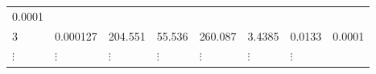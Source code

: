 \documentclass[]{book}
\begin{document}
\begin{enumerate}
\begin{longtable}[]{@{}llllllll@{}}
\begin{minipage}[t]{0.11\columnwidth}
  0.0001\strut
  \end{minipage}\tabularnewline
  \begin{minipage}[t]{0.02\columnwidth}\raggedright
  3\strut
  \end{minipage} & \begin{minipage}[t]{0.12\columnwidth}\raggedright
  0.000127\strut
  \end{minipage} & \begin{minipage}[t]{0.07\columnwidth}\raggedright
  204.551\strut
  \end{minipage} & \begin{minipage}[t]{0.07\columnwidth}\raggedright
  55.536\strut
  \end{minipage} & \begin{minipage}[t]{0.10\columnwidth}\raggedright
  260.087\strut
  \end{minipage} & \begin{minipage}[t]{0.20\columnwidth}\raggedright
  3.4385\strut
  \end{minipage} & \begin{minipage}[t]{0.10\columnwidth}\raggedright
  0.0133\strut
  \end{minipage} & \begin{minipage}[t]{0.11\columnwidth}\raggedright
  0.0001\strut
  \end{minipage}\tabularnewline
  \begin{minipage}[t]{0.02\columnwidth}\raggedright
  \(\vdots\)\strut
  \end{minipage} & \begin{minipage}[t]{0.12\columnwidth}\raggedright
  \(\vdots\)\strut
  \end{minipage} & \begin{minipage}[t]{0.07\columnwidth}\raggedright
  \(\vdots\)\strut
  \end{minipage} & \begin{minipage}[t]{0.07\columnwidth}\raggedright
  \(\vdots\)\strut
  \end{minipage} & \begin{minipage}[t]{0.10\columnwidth}\raggedright
  \(\vdots\)\strut
  \end{minipage} & \begin{minipage}[t]{0.20\columnwidth}\raggedright
  \(\vdots\)\strut
  \end{minipage} & \begin{minipage}[t]{0.10\columnwidth}\raggedright
  \(\vdots\)\strut
  \end{minipage} & \begin{minipage}[t]{0.11\columnwidth}\raggedright

\end{minipage}
\end{longtable}
\end{enumerate}
\end{document}
